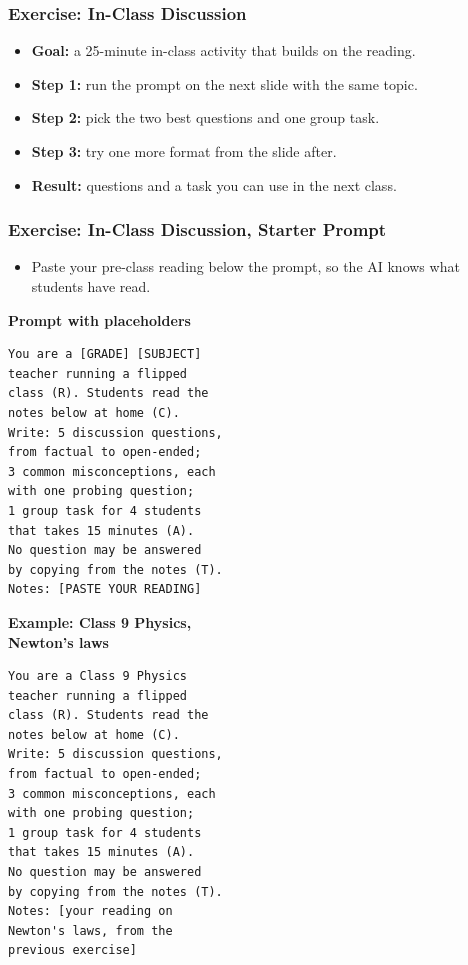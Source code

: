 \begin{frame}[fragile]\frametitle{Exercise: In-Class Discussion}
\begin{itemize}
\item \textbf{Goal:} a 25-minute in-class activity that builds on the reading.
\item \textbf{Step 1:} run the prompt on the next slide with the same topic.
\item \textbf{Step 2:} pick the two best questions and one group task.
\item \textbf{Step 3:} try one more format from the slide after.
\item \textbf{Result:} questions and a task you can use in the next class.
\end{itemize}
\end{frame}

\begin{frame}[fragile]\frametitle{Exercise: In-Class Discussion, Starter Prompt}
\begin{itemize}
\item Paste your pre-class reading below the prompt, so the AI knows what students have read.
\end{itemize}
\PairBegin
{\footnotesize\textbf{Prompt with placeholders}\\\mbox{}}
\begin{lstlisting}[language={},numbers=none]
You are a [GRADE] [SUBJECT]
teacher running a flipped
class (R). Students read the
notes below at home (C).
Write: 5 discussion questions,
from factual to open-ended;
3 common misconceptions, each
with one probing question;
1 group task for 4 students
that takes 15 minutes (A).
No question may be answered
by copying from the notes (T).
Notes: [PASTE YOUR READING]
\end{lstlisting}
\PairMid
{\footnotesize\textbf{Example: Class 9 Physics,\\ Newton's laws}}
\begin{lstlisting}[language={},numbers=none]
You are a Class 9 Physics
teacher running a flipped
class (R). Students read the
notes below at home (C).
Write: 5 discussion questions,
from factual to open-ended;
3 common misconceptions, each
with one probing question;
1 group task for 4 students
that takes 15 minutes (A).
No question may be answered
by copying from the notes (T).
Notes: [your reading on
Newton's laws, from the
previous exercise]
\end{lstlisting}
\PairEnd
\end{frame}


